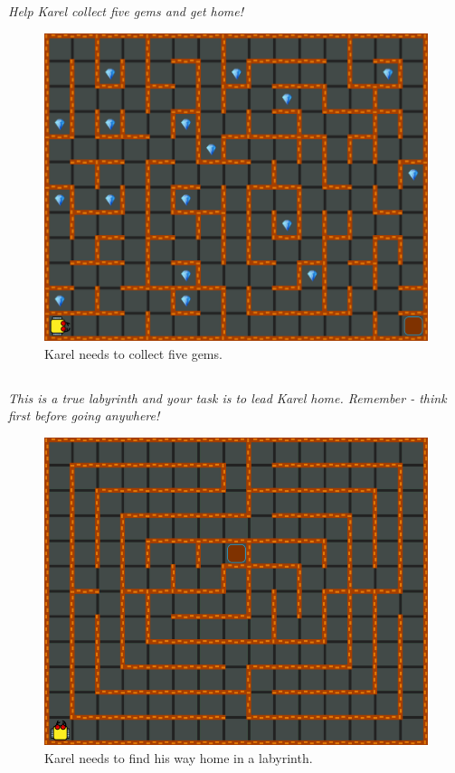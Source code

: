 \documentclass[article,A4,12pt]{llncs}
\begin{document}
\subsection{}

{\em​Help Karel collect five gems and get home!}

\begin{figure}[!ht]
\begin{center}
\includegraphics[height=0.4\textwidth]{imgk/a09.png}
\end{center}
\vspace{-4mm}
\caption{Karel needs to collect five gems.}
\label{fig:a09}
\vspace{-4mm}
\end{figure}
\noindent

\subsection{}

{\em This is a true labyrinth and your task is to lead Karel 
home. Remember - think first before going anywhere!}

\begin{figure}[!ht]
\begin{center}
\includegraphics[height=0.4\textwidth]{imgk/a10.png}
\end{center}
\vspace{-4mm}
\caption{Karel needs to find his way home in a labyrinth.}
\label{fig:a10}
\vspace{-4mm}
\end{figure}
\noindent
\end{document}

